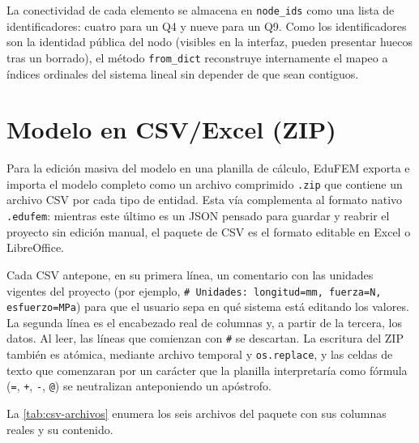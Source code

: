 La conectividad de cada elemento se almacena en \texttt{node\_ids} como una lista de identificadores: cuatro para un Q4 y nueve para un Q9. Como los identificadores son la identidad pública del nodo (visibles en la interfaz, pueden presentar huecos tras un borrado), el método \texttt{from\_dict} reconstruye internamente el mapeo a índices ordinales del sistema lineal sin depender de que sean contiguos.

\section{Modelo en CSV/Excel (ZIP)}

Para la edición masiva del modelo en una planilla de cálculo, EduFEM exporta e importa el modelo completo como un archivo comprimido \texttt{.zip} que contiene un archivo CSV por cada tipo de entidad. Esta vía complementa al formato nativo \texttt{.edufem}: mientras este último es un JSON pensado para guardar y reabrir el proyecto sin edición manual, el paquete de CSV es el formato editable en Excel o LibreOffice.

Cada CSV antepone, en su primera línea, un comentario con las unidades vigentes del proyecto (por ejemplo, \texttt{\# Unidades: longitud=mm, fuerza=N, esfuerzo=MPa}) para que el usuario sepa en qué sistema está editando los valores. La segunda línea es el encabezado real de columnas y, a partir de la tercera, los datos. Al leer, las líneas que comienzan con \texttt{\#} se descartan. La escritura del ZIP también es atómica, mediante archivo temporal y \texttt{os.replace}, y las celdas de texto que comenzaran por un carácter que la planilla interpretaría como fórmula (\texttt{=}, \texttt{+}, \texttt{-}, \texttt{@}) se neutralizan anteponiendo un apóstrofo.

La \autoref{tab:csv-archivos} enumera los seis archivos del paquete con sus columnas reales y su contenido.

